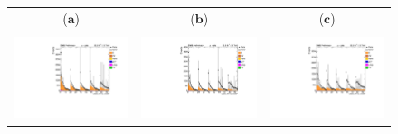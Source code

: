 \begin{figure}[htp]
\begin{tabular}{ccc}
   ($\mathbf{a}$)\qquad\qquad&($\mathbf{b}$)\qquad\qquad\qquad&($\mathbf{c}$)\qquad\qquad\qquad\\ \\
\hspace{-0.5cm}
\includegraphics[scale=0.3]{fig/chapt7/qcd/qcd_mu_ch/massH_cos_theta15_24.pdf}
& \hspace{-1.2cm} \includegraphics[scale=0.3]{fig/chapt7/qcd/qcd_mu_ch/massH_cos_theta24_43.pdf}
& \hspace{-1.2cm} \includegraphics[scale=0.3]{fig/chapt7/qcd/qcd_mu_ch/massH_cos_theta43_Inf.pdf}\\

\end{tabular}
\end{figure}
